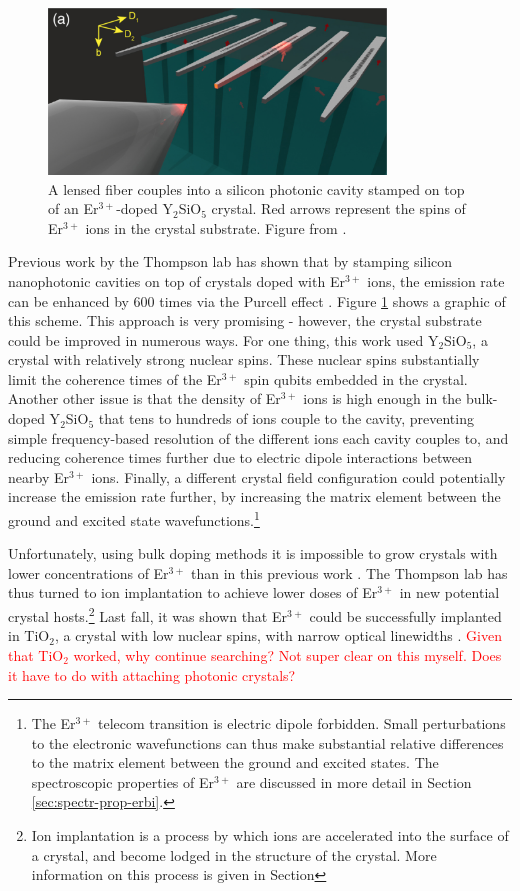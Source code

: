 \documentclass[12pt]{puthesis}
\newcommand{\erbium}[1][ ]{Er$^{3+}$#1}
\newcommand{\YSO}[1][ ]{Y$_{2}$SiO$_{5}$#1}
\newcommand{\TiO}[1][ ]{TiO$_{2}$#1}
\newcommand{\notetoself}[1]{\textcolor{red}{#1}}
\begin{document}
\begin{figure}[b]
  \centering
  \includegraphics[width=0.8\textwidth]{Nanophotonics}
  \caption{A lensed fiber couples into a silicon photonic cavity stamped on top of an \erbium[]-doped \YSO crystal. Red arrows represent the spins of \erbium ions in the crystal substrate. Figure from \cite{Dibos2017}.}
  \label{fig:cavity}
\end{figure}


Previous work by the Thompson lab has shown that by stamping silicon nanophotonic cavities on top of crystals doped with \erbium ions, the emission rate can be enhanced by 600 times via the Purcell effect \cite{Dibos2017}. Figure \ref{fig:cavity} shows a graphic of this scheme. This approach is very promising - however, the crystal substrate could be improved in numerous ways. For one thing, this work used \YSO[], a crystal with relatively strong nuclear spins. These nuclear spins substantially limit the coherence times of the \erbium spin qubits embedded in the crystal. Another other issue is that the density of \erbium ions is high enough in the bulk-doped \YSO that tens to hundreds of ions couple to the cavity, preventing simple frequency-based resolution of the different ions each cavity couples to, and reducing coherence times further due to electric dipole interactions between nearby \erbium ions. Finally, a different crystal field configuration could potentially increase the emission rate further, by increasing the matrix element between the ground and excited state wavefunctions.\footnote{The \erbium telecom transition is electric dipole forbidden. Small perturbations to the electronic wavefunctions can thus make substantial relative differences to the matrix element between the ground and excited states. The spectroscopic properties of \erbium are discussed in more detail in Section \ref{sec:spectr-prop-erbi}.}

Unfortunately, using bulk doping methods it is impossible to grow crystals with lower concentrations of \erbium than in this previous work \cite{Dibos2017}. The Thompson lab has thus turned to ion implantation to achieve lower doses of \erbium in new potential crystal hosts.\footnote{Ion implantation is a process by which ions are accelerated into the surface of a crystal, and become lodged in the structure of the crystal. More information on this process is given in Section } Last fall, it was shown that \erbium could be successfully implanted in \TiO[], a crystal with low nuclear spins, with narrow optical linewidths \cite{Phenicie2019}. \notetoself{Given that \TiO worked, why continue searching? Not super clear on this myself. Does it have to do with attaching photonic crystals?}
\end{document}
